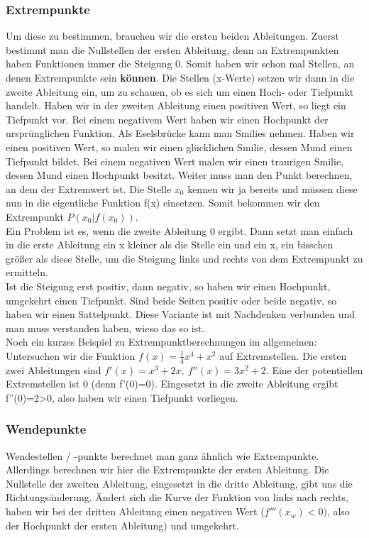 \subsubsection{Extrempunkte}
Um diese zu bestimmen,  brauchen wir die ersten beiden Ableitungen. Zuerst bestimmt man die Nullstellen der ersten Ableitung, denn an Extrempunkten haben Funktionen immer die Steigung 0. Somit haben wir schon mal Stellen, an denen Extrempunkte sein \textbf{können}. Die Stellen (x-Werte) setzen wir dann in die zweite Ableitung ein, um zu schauen, ob es sich um einen Hoch- oder Tiefpunkt handelt. Haben wir in der zweiten Ableitung einen positiven Wert, so liegt ein Tiefpunkt vor. Bei einem negativem Wert haben wir einen Hochpunkt der ursprünglichen Funktion. Als Eselsbrücke kann man Smilies nehmen. Haben wir einen positiven Wert, so malen wir einen glücklichen Smilie, dessen Mund einen Tiefpunkt bildet. Bei einem negativen Wert malen wir einen traurigen Smilie, dessen Mund einen Hochpunkt besitzt. Weiter muss man den Punkt berechnen, an dem der Extremwert ist. Die Stelle \(x_0\) kennen wir ja bereits und müssen diese nun in die eigentliche Funktion f(x) einsetzen. Somit bekommen wir den Extrempunkt \(P(x_0|f(x_0))\).\\
Ein Problem ist es, wenn die zweite Ableitung 0 ergibt. Dann setzt man einfach in die erste Ableitung ein x kleiner als die Stelle ein und ein x, ein bisschen größer als diese Stelle, um die Steigung links und rechts von dem Extrempunkt zu ermitteln. \\
Ist die Steigung erst positiv, dann negativ, so haben wir einen Hochpunkt, umgekehrt einen Tiefpunkt. Sind beide Seiten positiv oder beide negativ, so haben wir einen Sattelpunkt. Diese Variante ist mit Nachdenken verbunden und man muss verstanden haben, wieso das so ist.\\
Noch ein kurzes Beispiel zu Extrempunktberechnungen im allgemeinen: Untersuchen wir die Funktion \(f(x)=\frac{1}{4}x^4+x^2\) auf Extremstellen. Die ersten zwei Ableitungen sind \(f'(x)=x^3+2x,\ f''(x)=3x^2+2\). Eine der potentiellen Extremstellen ist 0 (denn f'(0)=0). Eingesetzt in die zweite Ableitung ergibt f''(0)=2>0, also haben wir einen Tiefpunkt vorliegen.
\subsubsection{Wendepunkte}
Wendestellen / -punkte berechnet man ganz ähnlich wie Extrempunkte. Allerdings berechnen wir hier die Extrempunkte der ersten Ableitung. Die Nullstelle der zweiten Ableitung, eingesetzt in die dritte Ableitung, gibt uns die Richtungsänderung. Ändert sich die Kurve der Funktion von links nach rechts, haben wir bei der dritten Ableitung einen negativen Wert (\(f'''(x_w)<0)\), also der Hochpunkt der ersten Ableitung) und umgekehrt.
